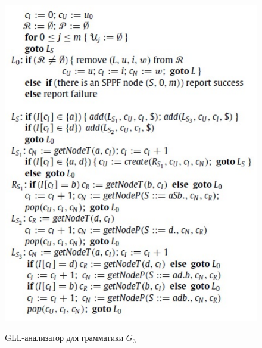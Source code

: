 \begin{figure}
 \centering
 \includegraphics[width=\textwidth]{Ragozina/pics/Listing1.pdf}
 \label{ListingGLL1}
 \caption{GLL-анализатор для грамматики $G_3$ }
\end{figure}


